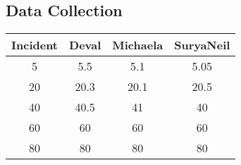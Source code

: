 \documentclass[svgnames]{article}     %
\begin{document}
\subsection{Data Collection}


\begin{center}
\begin{tabular}{ |c|c|c|c| }
 \hline
 Incident & Deval  & Michaela & SuryaNeil\\ 
 \hline
 5 & 5.5 & 5.1 & 5.05 \\ 
 \hline
 20 & 20.3 & 20.1 & 20.5 \\
 \hline
 40 & 40.5 & 41 & 40 \\
 \hline
 60 & 60 & 60 & 60 \\
 \hline
 80 & 80 & 80 & 80 \\
 \hline
\end{tabular}
\end{center}
\end{document}
